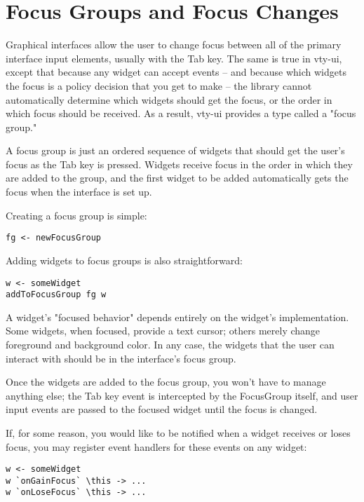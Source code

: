 \section{Focus Groups and Focus Changes}
\label{sec:focus}

Graphical interfaces allow the user to change focus between all of the
primary interface input elements, usually with the Tab key.  The same is
true in vty-ui, except that because any widget can accept events -- and
because which widgets the focus is a policy decision that you get to
make -- the library cannot automatically determine which widgets should
get the focus, or the order in which focus should be received.  As a
result, vty-ui provides a type called a "focus group."

A focus group is just an ordered sequence of widgets that should get the
user's focus as the Tab key is pressed.  Widgets receive focus in the
order in which they are added to the group, and the first widget to be
added automatically gets the focus when the interface is set up.

Creating a focus group is simple:

\begin{verbatim}
fg <- newFocusGroup
\end{verbatim}

Adding widgets to focus groups is also straightforward:

\begin{verbatim}
w <- someWidget
addToFocusGroup fg w
\end{verbatim}

A widget's "focused behavior" depends entirely on the widget's
implementation.  Some widgets, when focused, provide a text cursor;
others merely change foreground and background color.  In any case, the
widgets that the user can interact with should be in the interface's
focus group.

Once the widgets are added to the focus group, you won't have to manage
anything else; the Tab key event is intercepted by the FocusGroup
itself, and user input events are passed to the focused widget until the
focus is changed.

If, for some reason, you would like to be notified when a widget
receives or loses focus, you may register event handlers for these
events on any widget:

\begin{verbatim}
w <- someWidget
w `onGainFocus` \this -> ...
w `onLoseFocus` \this -> ...
\end{verbatim}

